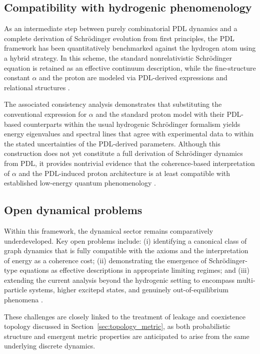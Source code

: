 \documentclass{article}
\begin{document}
\subsection{Compatibility with hydrogenic phenomenology}
\label{subsec:hydrogen_compatibility}

As an intermediate step between purely combinatorial PDL dynamics and a complete derivation of Schrödinger evolution from first principles, the PDL framework has been quantitatively benchmarked against the hydrogen atom using a hybrid strategy. In this scheme, the standard nonrelativistic Schrödinger equation is retained as an effective continuum description, while the fine-structure constant \(\alpha\) and the proton are modeled via PDL-derived expressions and relational structures \citep{Schrodinger_Sketch_v2_2026}.

The associated consistency analysis demonstrates that substituting the conventional expression for \(\alpha\) and the standard proton model with their PDL-based counterparts within the usual hydrogenic Schrödinger formalism yields energy eigenvalues and spectral lines that agree with experimental data to within the stated uncertainties of the PDL-derived parameters. Although this construction does not yet constitute a full derivation of Schrödinger dynamics from PDL, it provides nontrivial evidence that the coherence-based interpretation of \(\alpha\) and the PDL-induced proton architecture is at least compatible with established low-energy quantum phenomenology \citep{Schrodinger_Sketch_v2_2026,PDL_position}.

\subsection{Open dynamical problems}
\label{subsec:dynamical_open}

Within this framework, the dynamical sector remains comparatively underdeveloped. Key open problems include: (i) identifying a canonical class of graph dynamics that is fully compatible with the axioms and the interpretation of energy as a coherence cost; (ii) demonstrating the emergence of Schrödinger-type equations as effective descriptions in appropriate limiting regimes; and (iii) extending the current analysis beyond the hydrogenic setting to encompass multi-particle systems, higher excitepd states, and genuinely out-of-equilibrium phenomena
\citep{Coherence_Leakage_18_2026,PDL_position}.

These challenges are closely linked to the treatment of leakage and coexistence topology discussed in Section~\ref{sec:topology_metric}, as both probabilistic structure and emergent metric properties are anticipated to arise from the same underlying discrete dynamics.
\end{document}
